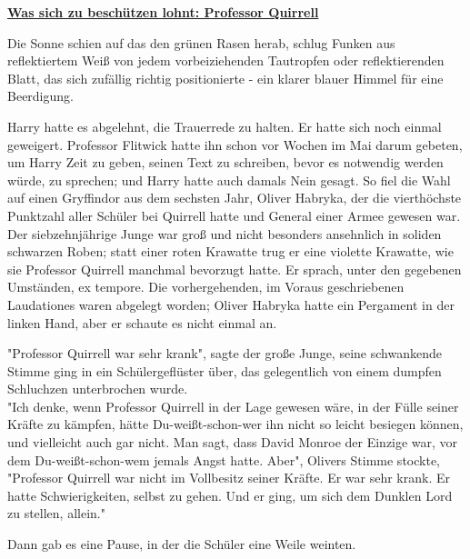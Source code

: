 

\hypertarget{was-sich-zu-beschuxfctzen-lohnt-professor-quirrell}{%

\textbf{\uline{Was sich zu beschützen lohnt: Professor Quirrell}}

Die Sonne schien auf das den grünen Rasen herab, schlug Funken aus reflektiertem Weiß von jedem vorbeiziehenden Tautropfen oder reflektierenden Blatt, das sich zufällig richtig positionierte - ein klarer blauer Himmel für eine Beerdigung.

Harry hatte es abgelehnt, die Trauerrede zu halten. Er hatte sich noch einmal geweigert. Professor Flitwick hatte ihn schon vor Wochen im Mai darum gebeten, um Harry Zeit zu geben, seinen Text zu schreiben, bevor es notwendig werden würde, zu sprechen; und Harry hatte auch damals Nein gesagt. So fiel die Wahl auf einen Gryffindor aus dem sechsten Jahr, Oliver Habryka, der die vierthöchste Punktzahl aller Schüler bei Quirrell hatte und General einer Armee gewesen war. Der siebzehnjährige Junge war groß und nicht besonders ansehnlich in soliden schwarzen Roben; statt einer roten Krawatte trug er eine violette Krawatte, wie sie Professor Quirrell manchmal bevorzugt hatte. Er sprach, unter den gegebenen Umständen, ex tempore. Die vorhergehenden, im Voraus geschriebenen Laudationes waren abgelegt worden; Oliver Habryka hatte ein Pergament in der linken Hand, aber er schaute es nicht einmal an.

"Professor Quirrell war sehr krank", sagte der große Junge, seine schwankende Stimme ging in ein Schülergeflüster über, das gelegentlich von einem dumpfen Schluchzen unterbrochen wurde.\\ "Ich denke, wenn Professor Quirrell in der Lage gewesen wäre, in der Fülle seiner Kräfte zu kämpfen, hätte Du-weißt-schon-wer ihn nicht so leicht besiegen können, und vielleicht auch gar nicht. Man sagt, dass David Monroe der Einzige war, vor dem Du-weißt-schon-wem jemals Angst hatte. Aber", Olivers Stimme stockte, "Professor Quirrell war nicht im Vollbesitz seiner Kräfte. Er war sehr krank. Er hatte Schwierigkeiten, selbst zu gehen. Und er ging, um sich dem Dunklen Lord zu stellen, allein."

Dann gab es eine Pause, in der die Schüler eine Weile weinten.

}
